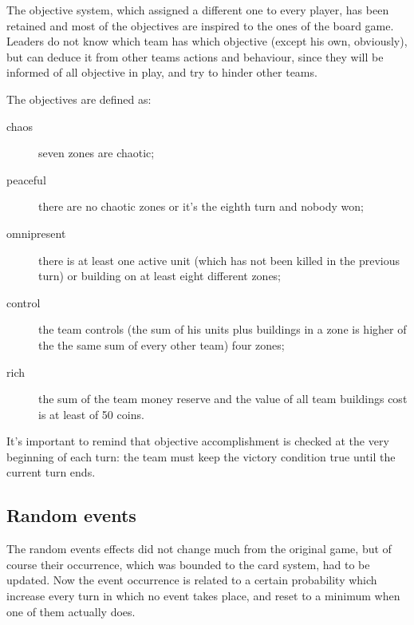 			The objective system, which assigned a different one to every player, has been retained and most of the objectives are inspired to the ones of the board game. Leaders do not know which team has which objective (except his own, obviously), but can deduce it from other teams actions and behaviour, since they will be informed of all objective in play, and try to hinder other teams.
			
			The objectives are defined as:
			\begin{description}
				\item[chaos] seven zones are chaotic;
				\item[peaceful] there are no chaotic zones or it's the eighth turn and nobody won;
				\item[omnipresent] there is at least one active unit (which has not been killed in the previous turn) or building on at least eight different zones;
				\item[control] the team controls (the sum of his units plus buildings in a zone is higher of the the same sum of every other team) four zones;
				\item[rich] the sum of the team money reserve and the value of all team buildings cost is at least of 50 coins.
			\end{description}
			
			It's important to remind that objective accomplishment is checked at the very beginning of each turn: the team must keep the victory condition true until the current turn ends.
			
		\subsection{Random events}
			
			The random events effects did not change much from the original game, but of course their occurrence, which was bounded to the card system, had to be updated. Now the event occurrence is related to a certain probability which increase every turn in which no event takes place, and reset to a minimum when one of them actually does.
			
